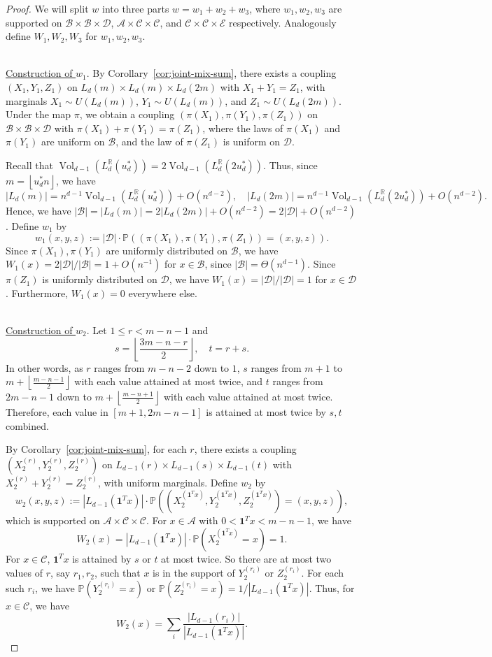\documentclass{article}
\newcommand{\floor}[1]{\left\lfloor #1 \right\rfloor}
\newcommand{\RR}{\mathbb{R}}
\newcommand{\PP}{\mathbb{P}}
\newcommand{\cA}{\mathcal{A}}
\newcommand{\cB}{\mathcal{B}}
\newcommand{\cC}{\mathcal{C}}
\newcommand{\cD}{\mathcal{D}}
\newcommand{\cE}{\mathcal{E}}
\newcommand{\ones}{\mathbf{1}}
\theoremstyle{definition}
\DeclareMathOperator{\Vol}{Vol}
\begin{document}
\begin{proof}
    We will split $w$ into three parts $w=w_1+w_2+w_3$, where $w_1,w_2,w_3$ are supported on $\cB\times \cB\times \cD$, $\cA\times \cC\times \cC$, and $\cC\times \cC\times \cE$ respectively. Analogously define $W_1,W_2,W_3$ for $w_1,w_2,w_3$.

    \noindent\\
    \underline{Construction of $w_1$}. By Corollary~\ref{cor:joint-mix-sum}, there exists a coupling $(X_1,Y_1,Z_1)$ on $L_{d}(m)\times L_{d}(m)\times L_{d}(2m)$ with $X_1+Y_1=Z_1$, with marginals $X_1\sim U(L_{d}(m))$, $Y_1\sim U(L_{d}(m))$, and $Z_1\sim U(L_{d}(2m))$. Under the map $\pi$, we obtain a coupling $(\pi(X_1),\pi(Y_1),\pi(Z_1))$ on $\cB\times \cB\times \cD$ with $\pi(X_1)+\pi(Y_1)=\pi(Z_1)$, where the laws of $\pi(X_1)$ and $\pi(Y_1)$ are uniform on $\cB$, and the law of $\pi(Z_1)$ is uniform on $\cD$. 

    Recall that $\Vol_{d-1}(L_d^{\RR}(u_d^*))=2\Vol_{d-1}(L_d^{\RR}(2u_d^*))$. Thus, since $m=\floor{u_d^* n}$, we have 
    \[|L_{d}(m)|=n^{d-1}\Vol_{d-1}(L_d^{\RR}(u_d^*))+O(n^{d-2}),\quad |L_{d}(2m)|=n^{d-1}\Vol_{d-1}(L_d^{\RR}(2u_d^*))+O(n^{d-2}).\]
    Hence, we have $|\cB|=|L_{d}(m)|=2|L_{d}(2m)|+O(n^{d-2})=2|\cD|+O(n^{d-2})$. Define $w_1$ by
    \[w_1(x,y,z) := |\cD| \cdot \PP((\pi(X_1), \pi(Y_1), \pi(Z_1))=(x,y,z)).\]
    Since $\pi(X_1),\pi(Y_1)$ are uniformly distributed on $\cB$, we have $W_1(x) = 2|\cD|/|\cB|=1+O(n^{-1})$ for $x\in \cB$, since $|\cB|=\Theta(n^{d-1})$. Since $\pi(Z_1)$ is uniformly distributed on $\cD$, we have $W_1(x) = |\cD|/|\cD| = 1$ for $x\in \cD$. Furthermore, $W_1(x)=0$ everywhere else. 

    \noindent\\
    \underline{Construction of $w_2$}. Let $1\leq r < m-n-1$ and
    \[s=\floor{\frac{3m-n-r}{2}},\quad t=r+s.\]
    In other words, as $r$ ranges from $m-n-2$ down to $1$, $s$ ranges from $m+1$ to $m+\floor{\frac{m-n-1}{2}}$ with each value attained at most twice, and $t$ ranges from $2m-n-1$ down to $m+\floor{\frac{m-n+1}{2}}$ with each value attained at most twice. Therefore, each value in $[m+1,2m-n-1]$ is attained at most twice by $s,t$ combined. 
    
    By Corollary~\ref{cor:joint-mix-sum}, for each $r$, there exists a coupling $(X_2^{(r)},Y_2^{(r)},Z_2^{(r)})$ on $L_{d-1}(r)\times L_{d-1}(s)\times L_{d-1}(t)$ with $X_2^{(r)}+Y_2^{(r)}=Z_2^{(r)}$, with uniform marginals. Define $w_2$ by
    \[w_2(x,y,z) := |L_{d-1}(\ones^T x)|\cdot \PP((X_2^{(\ones^T x)},Y_2^{(\ones^T x)},Z_2^{(\ones^T x)})=(x,y,z)),\]
    which is supported on $\cA\times \cC\times \cC$. For $x\in \cA$ with $0< \ones^T x < m-n-1$, we have
    \[W_2(x) = |L_{d-1}(\ones^T x)| \cdot \PP(X_2^{(\ones^T x)}=x) = 1.\]
    For $x\in \cC$, $\ones^T x$ is attained by $s$ or $t$ at most twice. So there are at most two values of $r$, say $r_1,r_2$, such that $x$ is in the support of $Y_2^{(r_i)}$ or $Z_2^{(r_i)}$. For each such $r_i$, we have $\PP(Y_2^{(r_i)}=x)$ or $\PP(Z_2^{(r_i)}=x) = 1/|L_{d-1}(\ones^T x)|$. Thus, for $x\in \cC$, we have
    \[W_2(x) = \sum_i \frac{|L_{d-1}(r_i)|}{|L_{d-1}(\ones^T x)|}.\]


\end{proof}
\end{document}

